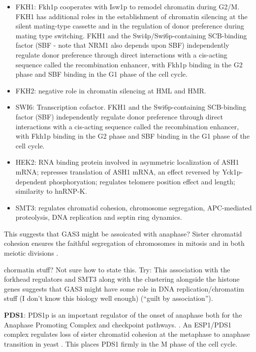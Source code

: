 \documentclass[]{article}
\begin{document}
\begin{itemize}
	\item FKH1: Fkh1p cooperates with Isw1p to remodel chromatin during G2/M. FKH1 has additional roles in the establishment of chromatin silencing at the silent mating-type cassette and in the regulation of donor preference during mating type switching. FKH1 and the Swi4p/Swi6p-containing SCB-binding factor (SBF - note that NRM1 also depends upon SBF) independently regulate donor preference through direct interactions with a cis-acting sequence called the recombination enhancer, with Fkh1p binding in the G2 phase and SBF binding in the G1 phase of the cell cycle. 
	\item FKH2: negative role in chromatin silencing at HML and HMR.
	\item SWI6: Transcription cofactor. FKH1 and the Swi6p-containing SCB-binding factor (SBF) independently regulate donor preference through direct interactions with a cis-acting sequence called the recombination enhancer, with Fkh1p binding in the G2 phase and SBF binding in the G1 phase of the cell cycle.
	\item HEK2: RNA binding protein involved in asymmetric localization of ASH1 mRNA; represses translation of ASH1 mRNA, an effect reversed by Yck1p-dependent phosphoryation; regulates telomere position effect and length; similarity to hnRNP-K.
	\item SMT3: regulates chromatid cohesion, chromosome segregation, APC-mediated proteolysis, DNA replication and septin ring dynamics.
\end{itemize}
This suggests that GAS3 might be assoicated with anaphase?
Sister chromatid cohesion ensures the faithful segregation of chromosomes in mitosis and in both meiotic divisions \citep{cooper2009pds1p}.

 chormatin stuff? Not sure how to state this. Try: This association with the forkhead regulators and SMT3 along with the clustering alongside the histone genes suggests that GAS3 might have some role in DNA replication/chromatim stuff (I don't know this biology well enough)  (``guilt by association'').

\textbf{PDS1}: PDS1p is an important regulator of the onset of anaphase both for the Anaphase Promoting Complex and checkpoint pathways. \citep{yamamoto1996pds1p, wang2001pds1}. An ESP1/PDS1 complex regulates loss of sister chromatid cohesion at the metaphase to anaphase transition in yeast \citep{ciosk1998esp1}. This places PDS1 firmly in the M phase of the cell cycle. 
\end{document}

